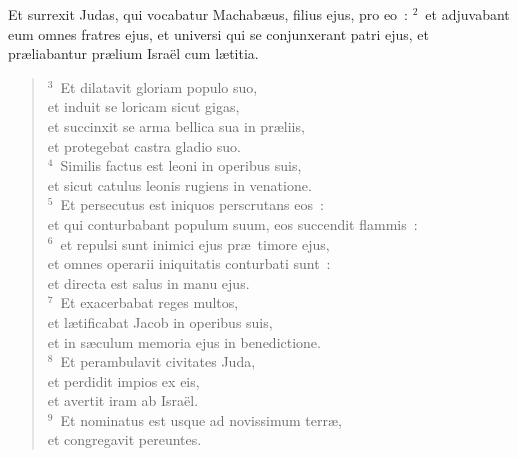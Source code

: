 \lettrine[lines=3,image=true,loversize=0.05,lraise=-0.03]{E}{}t surrexit Judas, qui vocabatur Machab\ae us, filius ejus, pro eo~:
${}^{2}$~et adjuvabant eum omnes fratres ejus, et universi qui se conjunxerant patri ejus, et pr\ae liabantur pr\ae lium Isra\"el cum l\ae titia.
\begin{flushleft}\begin{verse}${}^{3}$~Et dilatavit gloriam populo suo,\\ et induit se loricam sicut gigas,\\ et succinxit se arma bellica sua in pr\ae liis,\\ et protegebat castra gladio suo.\\
${}^{4}$~Similis factus est leoni in operibus suis,\\ et sicut catulus leonis rugiens in venatione.\\
${}^{5}$~Et persecutus est iniquos perscrutans eos~:\\ et qui conturbabant populum suum, eos succendit flammis~:\\
${}^{6}$~et repulsi sunt inimici ejus pr\ae\ timore ejus,\\ et omnes operarii iniquitatis conturbati sunt~:\\ et directa est salus in manu ejus.\\
${}^{7}$~Et exacerbabat reges multos,\\ et l\ae tificabat Jacob in operibus suis,\\ et in s\ae culum memoria ejus in benedictione.\\
${}^{8}$~Et perambulavit civitates Juda,\\ et perdidit impios ex eis,\\ et avertit iram ab Isra\"el.\\
${}^{9}$~Et nominatus est usque ad novissimum terr\ae ,\\ et congregavit pereuntes.\end{verse}\end{flushleft}


